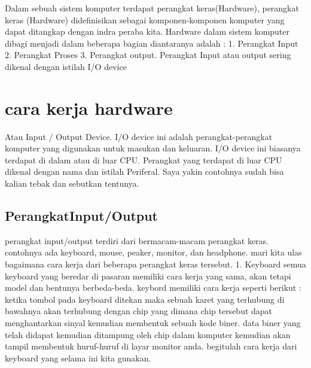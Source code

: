 Dalam sebuah sistem komputer terdapat perangkat keras(Hardware), perangkat keras (Hardware) didefinisikan sebagai komponen-komponen komputer yang dapat ditangkap dengan indra peraba kita. Hardware dalam sistem komputer dibagi menjadi dalam beberapa bagian diantaranya adalah : 1. Perangkat Input 2. Perangkat Proses 3. Perangkat output. Perangkat Input atau output sering dikenal dengan istilah I/O device 

\section{cara kerja hardware}
Atau Input / Output Device. I/O device ini adalah perangkat-perangkat komputer yang digunakan untuk masukan dan keluaran. I/O device ini biasanya terdapat di dalam atau di luar CPU. Perangkat yang terdapat di luar CPU dikenal dengan nama dan istilah Periferal. Saya yakin contohnya sudah bisa kalian tebak dan sebutkan tentunya.

\subsection{PerangkatInput/Output}
	perangkat input/output terdiri dari bermacam-macam perangkat keras. contohnya ada keyboard, mouse, peaker, monitor, dan headphone.
	mari kita ulas bagaimana cara kerja dari beberapa perangkat keras tersebut.
	1. Keyboard
	semua keyboard yang beredar di pasaran memiliki cara kerja yang sama, akan tetapi model dan bentunya berbeda-beda. keybord memiliki cara kerja seperti berikut :
	ketika tombol pada keyboard ditekan maka sebuah karet yang terhubung di bawahnya akan terhubung dengan chip yang dimana chip tersebut dapat menghantarkan sinyal kemudian membentuk sebuah kode biner.
	data biner yang telah didapat kemudian ditampung oleh chip dalam komputer kemudian akan tampil membentuk huruf-huruf di layar monitor anda.
	begitulah cara kerja dari keyboard yang selama ini kita gunakan.
